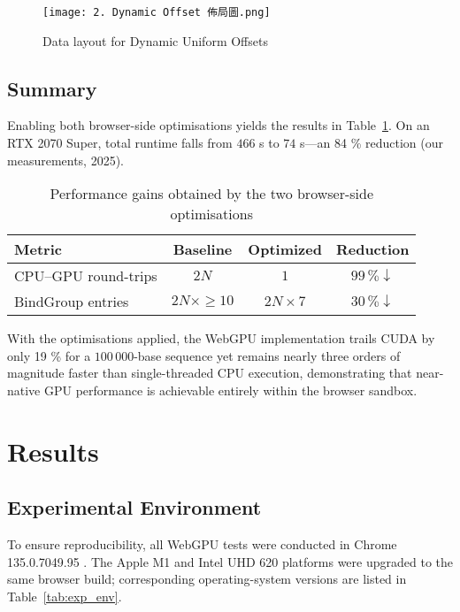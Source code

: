 \documentclass[PhD]{PHlab-thesis}
\begin{document}
\begin{figure}[htbp]
  \centering
  \texttt{[image: 2. Dynamic Offset 佈局圖.png]}
  \caption{Data layout for Dynamic Uniform Offsets}
  \label{fig:dynamic-offset-layout}
\end{figure}
\newpage
\section{Summary}

Enabling both browser-side optimisations yields the results in Table~\ref{tab:opt_performance}. On an RTX 2070 Super, total runtime falls from $466$ s to $74$ s—an 84 \% reduction (our measurements, 2025).

\begin{table}[h]
  \centering
  \setlength{\tabcolsep}{6pt}
  \renewcommand{\arraystretch}{1.35}
  \small
  \begin{tabularx}{\textwidth}{|X|c|c|c|}
    \hline
    Metric & Baseline & Optimized & Reduction \\
    \hline
    CPU–GPU round-trips & $2N$ & $1$ & $99\,\%\!\downarrow$ \\
    BindGroup entries    & $2N \times \ge 10$ & $2N \times 7$ & $30\,\%\!\downarrow$ \\
    \hline
  \end{tabularx}
  \caption{Performance gains obtained by the two browser-side optimisations}
  \label{tab:opt_performance}
\end{table}

With the optimisations applied, the WebGPU implementation trails CUDA by only 19 \% for a \(100\,000\)-base sequence yet remains nearly three orders of magnitude faster than single-threaded CPU execution, demonstrating that near-native GPU performance is achievable entirely within the browser sandbox.





	
\chapter{Results}

\section{Experimental Environment}

To ensure reproducibility, all WebGPU tests were conducted in Chrome \\ 135.0.7049.95 \cite{Chrome2024-blog}. The Apple M1 and Intel UHD 620 platforms were upgraded to the same browser build; corresponding operating-system versions are listed in Table~\ref{tab:exp_env}.
\end{document}
